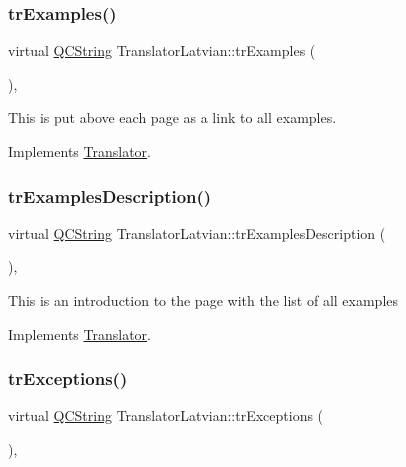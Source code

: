 \subsubsection{\texorpdfstring{trExamples()}{trExamples()}}
{\footnotesize\ttfamily virtual \mbox{\hyperlink{class_q_c_string}{Q\+C\+String}} Translator\+Latvian\+::tr\+Examples (\begin{DoxyParamCaption}{ }\end{DoxyParamCaption})\hspace{0.3cm}{\ttfamily [inline]}, {\ttfamily [virtual]}}

This is put above each page as a link to all examples. 

Implements \mbox{\hyperlink{class_translator}{Translator}}.

\mbox{\label{class_translator_latvian_a58d01a1801f5919281724f6ebcf83b14}} 
\subsubsection{\texorpdfstring{trExamplesDescription()}{trExamplesDescription()}}
{\footnotesize\ttfamily virtual \mbox{\hyperlink{class_q_c_string}{Q\+C\+String}} Translator\+Latvian\+::tr\+Examples\+Description (\begin{DoxyParamCaption}{ }\end{DoxyParamCaption})\hspace{0.3cm}{\ttfamily [inline]}, {\ttfamily [virtual]}}

This is an introduction to the page with the list of all examples 

Implements \mbox{\hyperlink{class_translator}{Translator}}.

\mbox{\label{class_translator_latvian_aacde6e4e96f397053eeddabaa9ecaadd}} 
\subsubsection{\texorpdfstring{trExceptions()}{trExceptions()}}
{\footnotesize\ttfamily virtual \mbox{\hyperlink{class_q_c_string}{Q\+C\+String}} Translator\+Latvian\+::tr\+Exceptions (\begin{DoxyParamCaption}{ }\end{DoxyParamCaption})\hspace{0.3cm}{\ttfamily [inline]}, {\ttfamily [virtual]}}


